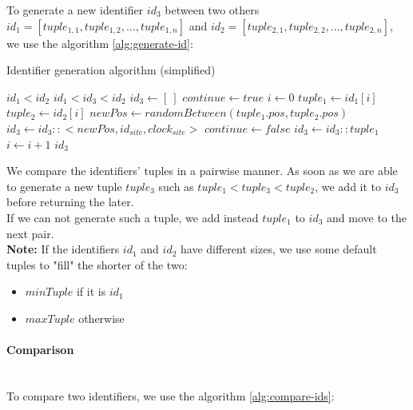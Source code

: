 \documentclass[a4paper]{article}
\begin{document}
To generate a new identifier $id_3$ between two others
$id_1 = [tuple_{1,1}, tuple_{1,2},...,tuple_{1,n}]$ and
$id_2 = [tuple_{2,1}, tuple_{2,2},...,tuple_{2,n}]$,
we use the algorithm \ref{alg:generate-id}:


\begin{algorithm}
  \caption{Identifier generation algorithm (simplified)}\label{alg:generate-id}
  \begin{algorithmic}
      \Require $id_1 < id_2$
      \Ensure $id_1 < id_3 < id_2$
      \Statex
      \State $id_3 \gets [~]$
      \State $continue \gets true$
      \State $i \gets 0$
        \State $tuple_1 \gets id_1[i]$
        \State $tuple_2 \gets id_2[i]$
          \State $newPos \gets randomBetween(tuple_1.pos, tuple_2.pos)$
          \State $id_3 \gets id_3 :: <newPos, id_{site}, clock_{site}>$
          \State $continue \gets false$
        \Else
          \State $id_3 \gets id_3 :: tuple_1$
        \EndIf
        \State $i \gets i+1$
      \EndWhile
      \State \Return $id_3$
    \EndFunction
  \end{algorithmic}
\end{algorithm}


We compare the identifiers' tuples in a pairwise manner.
As soon as we are able to generate a new tuple $tuple_3$ such as $tuple_1 < tuple_3 < tuple_2$,
we add it to $id_3$ before returning the later.
\\
If we can not generate such a tuple,
we add instead $tuple_1$ to $id_3$ and move to the next pair.
\\
\textbf{Note:} If the identifiers $id_1$ and $id_2$ have different sizes,
we use some default tuples to "fill" the shorter of the two:
\begin{itemize}
  \item $minTuple$ if it is $id_1$
  \item $maxTuple$ otherwise
\end{itemize}

\paragraph{Comparison} ~\\

To compare two identifiers, we use the algorithm \ref{alg:compare-ids}:
\end{document}
